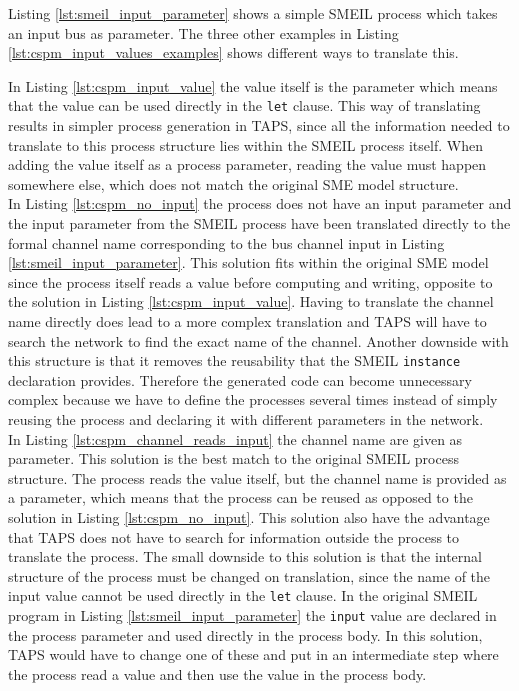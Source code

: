Listing \ref{lst:smeil_input_parameter} shows a simple SMEIL process which takes an input bus as parameter. The three other examples in Listing \ref{lst:cspm_input_values_examples} shows different ways to translate this.

In Listing \ref{lst:cspm_input_value} the value itself is the parameter which means that the value can be used directly in the \texttt{let} clause.
This way of translating results in simpler process generation in TAPS, since all the information needed to translate to this process structure lies within the SMEIL process itself.
When adding the value itself as a process parameter, reading the value must happen somewhere else, which does not match the original SME model structure. \\

In Listing \ref{lst:cspm_no_input} the process does not have an input parameter and the input parameter from the SMEIL process have been translated directly to the formal channel name corresponding to the bus channel input in Listing \ref{lst:smeil_input_parameter}. This solution fits within the original SME model since the process itself reads a value before computing and writing, opposite to the solution in Listing \ref{lst:cspm_input_value}. Having to translate the channel name directly does lead to a more complex translation and TAPS will have to search the network to find the exact name of the channel. Another downside with this structure is that it removes the reusability that the SMEIL \texttt{instance} declaration provides. Therefore the generated code can become unnecessary complex because we have to define the processes several times instead of simply reusing the process and declaring it with different parameters in the network.\\

In Listing \ref{lst:cspm_channel_reads_input} the channel name are given as parameter. This solution is the best match to the original SMEIL process structure. The process reads the value itself, but the channel name is provided as a parameter, which means that the process can be reused as opposed to the solution in Listing \ref{lst:cspm_no_input}. This solution also have the advantage that TAPS does not have to search for information outside the process to translate the process.
The small downside to this solution is that the internal structure of the process must be changed on translation, since the name of the input value cannot be used directly in the \texttt{let} clause. In the original SMEIL program in Listing \ref{lst:smeil_input_parameter} the \texttt{input} value are declared in the process parameter and used directly in the process body. In this solution, TAPS would have to change one of these and put in an intermediate step where the process read a value and then use the value in the process body.\\

